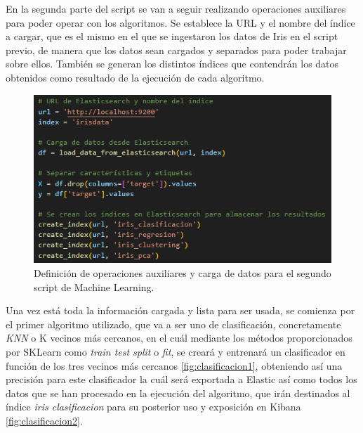 En la segunda parte del script se van a seguir realizando operaciones auxiliares para poder operar con los algoritmos. Se establece la URL y el nombre del índice a cargar, que es el mismo en el que se ingestaron los datos de Iris en el script previo, de manera que los datos sean cargados y separados para poder trabajar sobre ellos. También se generan los distintos índices que contendrán los datos obtenidos como resultado de la ejecución de cada algoritmo.

\begin{figure}
    \centering
    \includegraphics[width=1\linewidth]{img/iris5.png}
    \caption{Definición de operaciones auxiliares y carga de datos para el segundo script de Machine Learning.}
    \label{fig:script22}
\end{figure}

Una vez está toda la información cargada y lista para ser usada, se comienza por el primer algoritmo utilizado, que va a ser uno de clasificación, concretamente \textit{KNN} o K vecinos más cercanos, en el cuál mediante los métodos proporcionados por SKLearn como \textit{train test split}  o \textit{fit}, se creará y entrenará un clasificador en función de los tres vecinos más cercanos \ref{fig:clasificacion1}, obteniendo así una precisión para este clasificador la cuál será exportada a Elastic así como todos los datos que se han procesado en la ejecución del algoritmo, que irán destinados al índice \textit{iris clasificacion} para su posterior uso y exposición en Kibana \ref{fig:clasificacion2}. 

